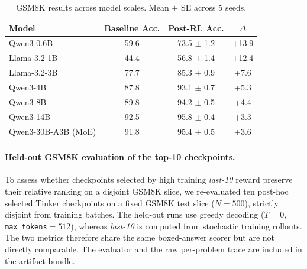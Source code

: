 \documentclass{article}
\begin{document}
\begin{table}[htbp]
\centering
\caption{GSM8K results across model scales. Mean $\pm$ SE across 5 seeds.}
\label{tab:results_gsm8k}
\begin{tabular}{lccc}
\toprule
\textbf{Model} & \textbf{Baseline Acc.} & \textbf{Post-RL Acc.} & \textbf{$\Delta$} \\
\midrule
Qwen3-0.6B & 59.6 & 73.5 $\pm$ 1.2 & +13.9 \\
Llama-3.2-1B & 44.4 & 56.8 $\pm$ 1.4 & +12.4 \\
Llama-3.2-3B & 77.7 & 85.3 $\pm$ 0.9 & +7.6 \\
Qwen3-4B & 87.8 & 93.1 $\pm$ 0.7 & +5.3 \\
Qwen3-8B & 89.8 & 94.2 $\pm$ 0.5 & +4.4 \\
Qwen3-14B & 92.5 & 95.8 $\pm$ 0.4 & +3.3 \\
Qwen3-30B-A3B (MoE) & 91.8 & 95.4 $\pm$ 0.5 & +3.6 \\
\bottomrule
\end{tabular}
\end{table}

\paragraph{Held-out GSM8K evaluation of the top-10 checkpoints.}
To assess whether checkpoints selected by high training \emph{last-10} reward
preserve their relative ranking on a disjoint GSM8K slice, we re-evaluated
ten post-hoc selected
Tinker checkpoints on a fixed GSM8K test slice ($N=500$), strictly disjoint
from training batches. The held-out runs use greedy decoding ($T{=}0$,
\texttt{max\_tokens}$=512$), whereas \emph{last-10} is computed from
stochastic training rollouts. The two metrics therefore share the same
boxed-answer scorer but are not directly comparable.
The evaluator and the raw per-problem trace are included in the artifact
bundle.
\end{document}
